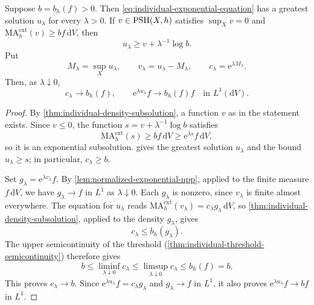 \begin{corollary}\label{cor:individual-positive-threshold-exponential}
Suppose $b=b_h(f)>0$. Then \eqref{eq:individual-exponential-equation} has a greatest solution $u_\lambda$ for every $\lambda>0$. If $v\in\mathrm{PSH}(X,h)$ satisfies $\sup_Xv=0$ and
$\mathrm{MA}^{\mathrm{ext}}_h(v)\geq bf\,\mathrm{d}V$, then
\[
 u_\lambda\geq v+\lambda^{-1}\log b.
\]
Put
\[
 M_\lambda=\sup_Xu_\lambda,\qquad
 v_\lambda=u_\lambda-M_\lambda,\qquad
 c_\lambda=\mathrm{e}^{\lambda M_\lambda}.
\]
Then, as $\lambda\downarrow0$,
\[
 c_\lambda\longrightarrow b_h(f),\qquad
 \mathrm{e}^{\lambda u_\lambda}f\longrightarrow b_h(f)f
           \quad\text{in }L^1(\mathrm{d}V).
\]
\end{corollary}
\begin{proof}
By \cref{thm:individual-density-subsolution}, a function $v$ as in the statement exists. Since $v\leq0$, the function $s=v+\lambda^{-1}\log b$ satisfies
\[
 \mathrm{MA}^{\mathrm{ext}}_h(s)\geq bf\,\mathrm{d}V
       \geq\mathrm{e}^{\lambda s}f\,\mathrm{d}V,
\]
so it is an exponential subsolution.  gives the greatest solution $u_\lambda$ and the bound $u_\lambda\geq s$; in particular, $c_\lambda\geq b$.

Set $g_\lambda=\mathrm{e}^{\lambda v_\lambda}f$. By \cref{lem:normalized-exponential-npp}, applied to the finite measure $f\,\mathrm{d}V$, we have $g_\lambda\to f$ in $L^1$ as $\lambda\downarrow0$. Each $g_\lambda$ is nonzero, since $v_\lambda$ is finite almost everywhere. The equation for $u_\lambda$ reads $\mathrm{MA}^{\mathrm{ext}}_h(v_\lambda)=c_\lambda g_\lambda\,\mathrm{d}V$, so \cref{thm:individual-density-subsolution}, applied to the density $g_\lambda$, gives
\[
 c_\lambda\leq b_h(g_\lambda).
\]
The upper semicontinuity of the threshold (\cref{thm:individual-threshold-semicontinuity}) therefore gives
\[
 b\leq\liminf_{\lambda\downarrow0}c_\lambda
 \leq\limsup_{\lambda\downarrow0}c_\lambda
 \leq b_h(f)=b.
\]
This proves $c_\lambda\to b$. Since $\mathrm{e}^{\lambda u_\lambda}f=c_\lambda g_\lambda$ and $g_\lambda\to f$ in $L^1$, it also proves $\mathrm{e}^{\lambda u_\lambda}f\to bf$ in $L^1$.
\end{proof}

